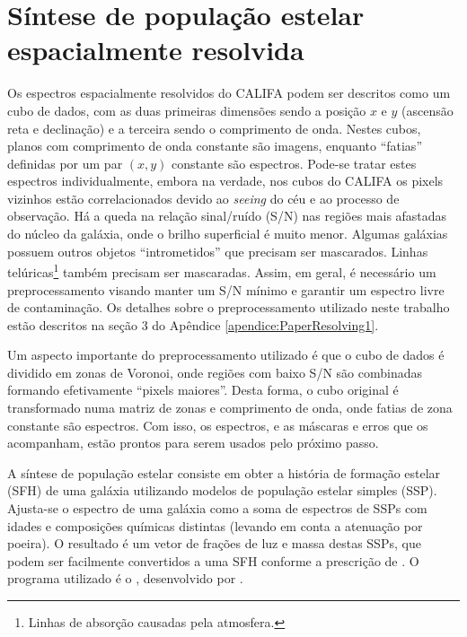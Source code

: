 
\section{Síntese de população estelar espacialmente resolvida}
\label{sec:Intro:Sintese}

Os espectros espacialmente resolvidos do CALIFA podem ser descritos como um cubo
de dados, com as duas primeiras dimensões sendo a posição $x$ e $y$ (ascensão
reta e declinação) e a terceira sendo o comprimento de onda. Nestes cubos,
planos com comprimento de onda constante são imagens, enquanto ``fatias''
definidas por um par $(x, y)$ constante são espectros. Pode-se tratar estes
espectros individualmente, embora na verdade, nos cubos do CALIFA os pixels
vizinhos estão correlacionados devido ao {\em seeing} do céu e ao processo de
observação. Há a queda na relação sinal/ruído (S/N) nas regiões mais afastadas
do núcleo da galáxia, onde o brilho superficial é muito menor.
Algumas galáxias possuem outros objetos ``intrometidos'' que precisam ser
mascarados. Linhas telúricas\footnote{Linhas de absorção causadas pela
atmosfera.} também precisam ser mascaradas. Assim, em geral, é necessário um
preprocessamento visando manter um S/N mínimo e garantir um espectro livre de
contaminação. Os detalhes sobre o preprocessamento utilizado neste trabalho
estão descritos na seção 3 do Apêndice \ref{apendice:PaperResolving1}.

Um aspecto importante do preprocessamento utilizado é que o cubo de dados é
dividido em zonas de Voronoi, onde regiões com baixo S/N são combinadas formando
efetivamente ``pixels maiores''. Desta forma, o cubo original é transformado
numa matriz de zonas e comprimento de onda, onde fatias de zona constante são
espectros. Com isso, os espectros, e as máscaras e erros que os acompanham,
estão prontos para serem usados pelo próximo passo.

A síntese de população estelar consiste em obter a história de formação estelar
(SFH) de uma galáxia utilizando modelos de população estelar simples (SSP).
Ajusta-se o espectro de uma galáxia como a soma de espectros de SSPs com idades
e composições químicas distintas (levando em conta a atenuação por poeira). O
resultado é um vetor de frações de luz e massa destas SSPs, que podem ser
facilmente convertidos a uma SFH conforme a prescrição de \cite{Asari2007}.
O programa utilizado é o \starlight, desenvolvido por \cite{CidFernandes2005}.

